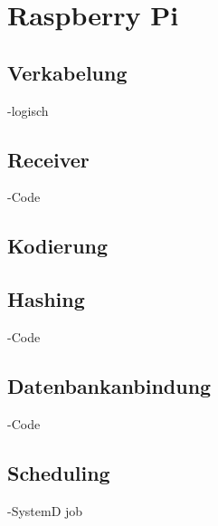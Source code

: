 \section{Raspberry Pi}
\subsection{Verkabelung}
-logisch
\subsection{Receiver}
-Code
\subsection{Kodierung}
\subsection{Hashing}
-Code
\subsection{Datenbankanbindung}
-Code
\subsection{Scheduling}
-SystemD job